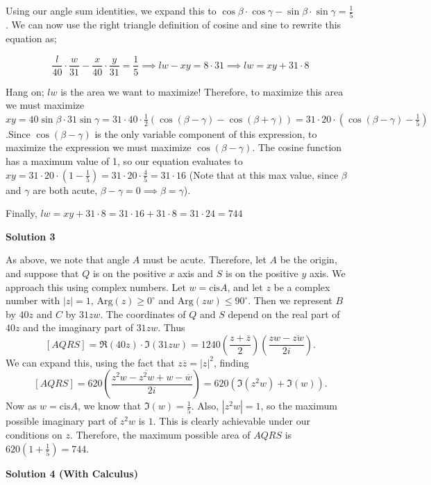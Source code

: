 \begin{enumerate}
 Using our angle sum identities, we expand this to $\cos \beta \cdot \cos \gamma - \sin \beta \cdot \sin \gamma = \frac{1}{5}$. We can now use the right triangle definition of cosine and sine to rewrite this equation as;

 
 \[\frac{l}{40} \cdot \frac{w}{31} - \frac{x}{40} \cdot \frac{y}{31} = \frac{1}{5} \implies lw- xy = 8 \cdot 31 \implies lw = xy + 31 \cdot 8\]

 Hang on; $lw$ is the area we want to maximize! Therefore, to maximize this area we must maximize $xy = 40 \sin \beta \cdot 31 \sin \gamma = 31 \cdot 40 \cdot \frac{1}{2}( \cos (\beta - \gamma) - \cos ( \beta + \gamma)) = 31 \cdot 20 \cdot (\cos(\beta-\gamma)-\frac{1}{5})$.Since $\cos(\beta-\gamma)$ is the only variable component of this expression, to maximize the expression we must maximize $\cos(\beta-\gamma)$. The cosine function has a maximum value of 1, so our equation evaluates to $xy = 31 \cdot 20 \cdot (1-\frac{1}{5}) = 31 \cdot 20 \cdot \frac{4}{5} = 31 \cdot 16$ (Note that at this max value, since $\beta$ and $\gamma$ are both acute, $\beta-\gamma=0 \implies \beta=\gamma$).

 Finally, $lw = xy + 31 \cdot 8 = 31 \cdot 16 + 31\cdot 8 = 31 \cdot 24 = \boxed{744}$




\textbf{Solution 3}

As above, we note that angle $A$ must be acute. Therefore, let $A$ be the origin, and suppose that $Q$ is on the positive $x$ axis and $S$ is on the positive $y$ axis. We approach this using complex numbers. Let $w=\text{cis} A$, and let $z$ be a complex number with $|z|=1$, $\text{Arg}(z)\ge 0^\circ$  and $\text{Arg}(zw)\le90^\circ$. Then we represent $B$ by $40z$ and $C$ by $31zw$. The coordinates of $Q$ and $S$ depend on the real part of $40z$ and the imaginary part of $31zw$. Thus
 \[[AQRS]=\Re(40z)\cdot \Im(31zw)=1240\left(\frac{z+\overline{z}}{2}\right)\left(\frac{zw-\overline{zw}}{2i}\right).\]We can expand this, using the fact that $z\overline{z}=|z|^2$, finding
 \[[AQRS]=620\left(\frac{z^2w-\overline{z^2w}+w-\overline{w}}{2i}\right)=620(\Im(z^2w)+\Im(w)).\]Now as $w=\text{cis}A$, we know that $\Im(w)=\frac15$. Also, $|z^2w|=1$, so the maximum possible imaginary part of $z^2w$ is $1$. This is clearly achievable under our conditions on $z$. Therefore, the maximum possible area of $AQRS$ is $620(1+\frac15)=\boxed{744}$.

 



\textbf{Solution 4 (With Calculus)}


\end{enumerate}
